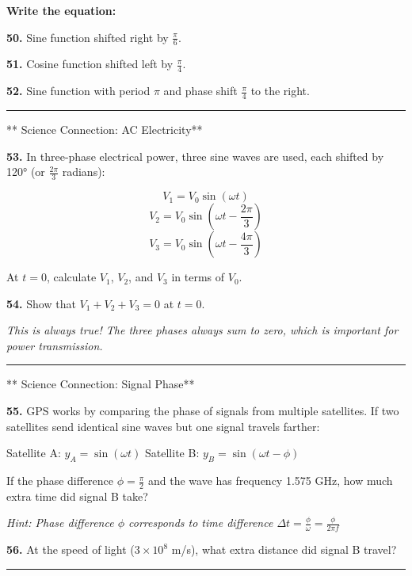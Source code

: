 \documentclass[
  11pt,
]{article}
\begin{document}
\textbf{Write the equation:}

\textbf{50.} Sine function shifted right by \(\frac{\pi}{6}\).

\textbf{51.} Cosine function shifted left by \(\frac{\pi}{4}\).

\textbf{52.} Sine function with period \(\pi\) and phase shift
\(\frac{\pi}{4}\) to the right.

\begin{center}\rule{0.5\linewidth}{0.5pt}\end{center}

** Science Connection: AC Electricity**

\textbf{53.} In three-phase electrical power, three sine waves are used,
each shifted by 120° (or \(\frac{2\pi}{3}\) radians):

\[V_1 = V_0\sin(\omega t)\]
\[V_2 = V_0\sin\left(\omega t - \frac{2\pi}{3}\right)\]
\[V_3 = V_0\sin\left(\omega t - \frac{4\pi}{3}\right)\]

At \(t = 0\), calculate \(V_1\), \(V_2\), and \(V_3\) in terms of
\(V_0\).

\textbf{54.} Show that \(V_1 + V_2 + V_3 = 0\) at \(t = 0\).

\emph{This is always true! The three phases always sum to zero, which is
important for power transmission.}

\begin{center}\rule{0.5\linewidth}{0.5pt}\end{center}

** Science Connection: Signal Phase**

\textbf{55.} GPS works by comparing the phase of signals from multiple
satellites. If two satellites send identical sine waves but one signal
travels farther:

Satellite A: \(y_A = \sin(\omega t)\) Satellite B:
\(y_B = \sin(\omega t - \phi)\)

If the phase difference \(\phi = \frac{\pi}{2}\) and the wave has
frequency 1.575 GHz, how much extra time did signal B take?

\emph{Hint: Phase difference \(\phi\) corresponds to time difference
\(\Delta t = \frac{\phi}{\omega} = \frac{\phi}{2\pi f}\)}

\textbf{56.} At the speed of light (\(3 \times 10^8\) m/s), what extra
distance did signal B travel?

\begin{center}\rule{0.5\linewidth}{0.5pt}\end{center}
\end{document}

